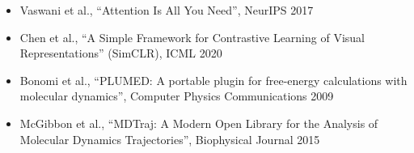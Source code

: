 \documentclass[12pt,a4paper]{article}
\begin{document}
\begin{itemize}
    \item Vaswani et al., ``Attention Is All You Need'', NeurIPS 2017
    \item Chen et al., ``A Simple Framework for Contrastive Learning of Visual Representations'' (SimCLR), ICML 2020
    \item Bonomi et al., ``PLUMED: A portable plugin for free-energy calculations with molecular dynamics'', Computer Physics Communications 2009
    \item McGibbon et al., ``MDTraj: A Modern Open Library for the Analysis of Molecular Dynamics Trajectories'', Biophysical Journal 2015
\end{itemize}
\end{document}
